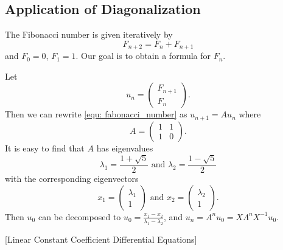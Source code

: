 \subsection{Application of Diagonalization}
\begin{example}
The Fibonacci number is given iteratively by 
\begin{equation}
\label{equ: fabonacci_number}
    F_{n+2} = F_{n} + F_{n + 1} 
\end{equation}
and $F_0 = 0$, $F_1 = 1$. Our goal is to obtain a formula for $F_n$.

Let 
\begin{equation}
    u_n = \begin{pmatrix}
        F_{n+1} \\
        F_{n}
    \end{pmatrix}.
\end{equation}
Then we can rewrite \ref{equ: fabonacci_number} as $u_{n+1} = Au_{n}$ 
where 
\begin{equation}
    A = \begin{pmatrix}
        1 & 1 \\
        1 & 0 
    \end{pmatrix}.
\end{equation}
It is easy to find that $A$ has eigenvalues 
\begin{equation}
    \lambda_1 = \frac{1 + \sqrt{5}}{2} \textrm{ and } 
    \lambda_2 = \frac{1 - \sqrt{5}}{2}
\end{equation}
with the corresponding eigenvectors 
\begin{equation}
    x_1 = \begin{pmatrix}
        \lambda_1 \\
        1
    \end{pmatrix}
    \textrm{ and }
    x_2 = \begin{pmatrix}
        \lambda_2 \\
        1
    \end{pmatrix}.
\end{equation}
Then $u_0$ can be decomposed to $u_0 = \frac{x_1 - x_2}
{\lambda_1 - \lambda_2}$, and $u_{n} = A^nu_0 = X\Lambda ^n X^{-1} u_0$. 
\end{example}

\begin{example}
    
    
\end{example}[Linear Constant Coefficient Differential Equations]

